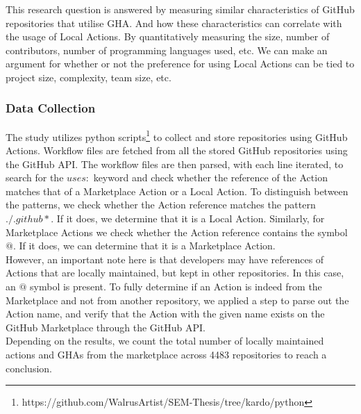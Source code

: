 \documentclass[conference]{IEEEtran}
\begin{document}
        This research question is answered by measuring similar characteristics of GitHub repositories that utilise GHA. And how these characteristics can correlate with the usage of Local Actions. By quantitatively measuring the size, number of contributors, number of programming languages used, etc. We can make an argument for whether or not the preference for using Local Actions can be tied to project size, complexity, team size, etc.
        \\

        \subsubsection{\textbf{Data Collection}}
	  The study utilizes python scripts\footnote{https://github.com/WalrusArtist/SEM-Thesis/tree/kardo/python} to collect and store repositories using GitHub Actions. Workflow files are fetched from all the stored GitHub repositories using the GitHub API.  The workflow files are then parsed, with each line iterated, to search for the $uses:$ keyword and check whether the reference of the Action matches that of a Marketplace Action or a Local Action. To distinguish between the patterns, we check whether the Action reference matches the pattern $./.github*$. If it does, we determine that it is a Local Action. Similarly, for Marketplace Actions we check whether the Action reference contains the symbol $@$. If it does, we can determine that it is a Marketplace Action. \\ However, an important note here is that developers may have references of Actions that are locally maintained, but kept in other repositories. In this case, an $@$ symbol is present. To fully determine if an Action is indeed from the Marketplace and not from another repository, we applied a step to parse out the Action name, and verify that the Action with the given name exists on the GitHub Marketplace through the GitHub API. \\ Depending on the results, we count the total number of locally maintained actions and GHAs from the marketplace across 4483 repositories to reach a conclusion.\\
\end{document}
